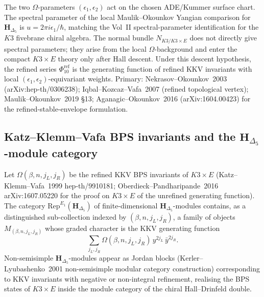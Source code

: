 \begin{remark}
\label{rem:K3xE-refined-spectral-parameter}
The two \(\Omega\)-parameters \((\epsilon_1,\epsilon_2)\) act on the
chosen ADE/Kummer surface chart. The spectral parameter of the local
Maulik--Okounkov Yangian comparison for \(\mathbf{H}_{\Delta_5}\) is
$u = 2\pi i \epsilon_1/\hbar$, matching the Vol~II spectral-parameter
identification for the $K3$ fivebrane chiral algebra.
The normal bundle $N_{K3/K3 \times E}$ does not directly give
spectral parameters; they arise from the local \(\Omega\)-background
and enter the compact \(K3\times E\) theory only after Hall descent.
Under this descent hypothesis, the refined series
\(\Phi_{10}^{\mathrm{ref}}\) is the generating function of refined KKV
invariants with local \((\epsilon_1,\epsilon_2)\)-equivariant weights.
Primary: Nekrasov--Okounkov~2003
(arXiv:hep-th/0306238); Iqbal--Kozcaz--Vafa~2007 (refined topological
vertex); Maulik--Okounkov~2019 \S13; Aganagic--Okounkov~2016
(arXiv:1604.00423) for the refined-stable-envelope formulation.
\end{remark}

\subsection{Katz--Klemm--Vafa BPS invariants and the
\texorpdfstring{$\mathbf{H}_{\Delta_5}$}{H-Delta-5}-module category}
\label{subsec:K3xE-kkv}

\begin{conjecture}
\label{conj:K3xE-kkv-module}
\ClaimStatusConjectured
Let $\Omega(\beta, n, j_L, j_R)$ be the refined KKV BPS invariants of
$K3 \times E$ (Katz--Klemm--Vafa~1999 hep-th/9910181;
Oberdieck--Pandharipande~2016 arXiv:1607.05220 for the proof on
$K3 \times E$ of the unrefined generating function). The category
$\mathrm{Rep}^{E_1}(\mathbf{H}_{\Delta_5})$ of finite-dimensional
$\mathbf{H}_{\Delta_5}$-modules contains, as a distinguished
sub-collection indexed by $(\beta, n, j_L, j_R)$, a family of objects
$M_{(\beta, n, j_L, j_R)}$ whose graded character is the KKV
generating function
\[
 \sum_{j_L, j_R} \Omega(\beta, n, j_L, j_R)\, y^{2 j_L}\, \bar y^{2 j_R}.
\]
Non-semisimple $\mathbf{H}_{\Delta_5}$-modules appear as Jordan blocks
(Kerler--Lyubashenko~2001 non-semisimple modular category construction)
corresponding to KKV invariants with negative or non-integral
refinement, realising the BPS states of $K3 \times E$ inside the
module category of the chiral Hall--Drinfeld double.
\end{conjecture}

